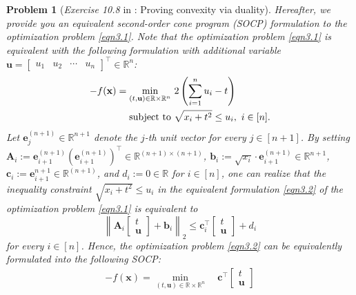 \documentclass[11pt]{article}
\newtheorem{problem}{Problem}
\numberwithin{equation}{problem}
\begin{document}
\begin{problem} [\emph{Exercise 10.8} in \cite{calafiore2014optimization}: Proving convexity via duality]
{\indent Hereafter, we provide you an equivalent second-order cone program (SOCP) formulation to the optimization problem \eqref{eqn3.1}. Note that the optimization problem \eqref{eqn3.1} is equivalent with the following formulation with additional variable $\mathbf{u} = \begin{bmatrix} u_1 & u_2 & \cdots & u_n \end{bmatrix}^{\top} \in \mathbb{R}^n$:
\begin{equation}
    \label{eqn3.2}
    \begin{split}
        - f(\mathbf{x}) = \min_{\left( t, \mathbf{u} \right) \in \mathbb{R} \times \mathbb{R}^n} \ &2 \left( \sum_{i=1}^{n} u_i - t \right) \\
        \textnormal{subject to } & \sqrt{x_i + t^2} \leq u_i,\ i \in [n].
    \end{split}
\end{equation}
Let $\mathbf{e}_{j}^{(n+1)} \in \mathbb{R}^{n+1}$ denote the $j$-th unit vector for every $j \in [n+1]$. By setting $\mathbf{A}_i := \mathbf{e}_{i+1}^{(n+1)} \left( \mathbf{e}_{i+1}^{(n+1)} \right)^{\top} \in \mathbb{R}^{(n+1) \times (n+1)}$, $\mathbf{b}_i := \sqrt{x_i} \cdot \mathbf{e}_{i+1}^{(n+1)} \in \mathbb{R}^{n+1}$, $\mathbf{c}_i := \mathbf{e}_{i+1}^{n+1} \in \mathbb{R}^{(n+1)}$, and $d_i := 0 \in \mathbb{R}$ for $i \in [n]$, one can realize that the inequality constraint $\sqrt{x_i + t^2} \leq u_i$ in the equivalent formulation \eqref{eqn3.2} of the optimization problem \eqref{eqn3.1} is equivalent to
\begin{equation*}
    \left\| \mathbf{A}_i \begin{bmatrix} t \\ \mathbf{u} \end{bmatrix} + \mathbf{b}_i \right\|_{2} \leq \mathbf{c}_{i}^{\top} \begin{bmatrix} t \\ \mathbf{u} \end{bmatrix} + d_i
\end{equation*}
for every $i \in [n]$. Hence, the optimization problem \eqref{eqn3.2} can be equivalently formulated into the following SOCP:
\begin{equation}
    \label{eqn3.3}
    \begin{split}
        - f(\mathbf{x}) = \min_{\left( t, \mathbf{u} \right) \in \mathbb{R} \times \mathbb{R}^n} \ & \mathbf{c}^{\top} \begin{bmatrix} t \\ \mathbf{u} \end{bmatrix} \\

\end{split}
\end{equation}}
\end{problem}
\end{document}
